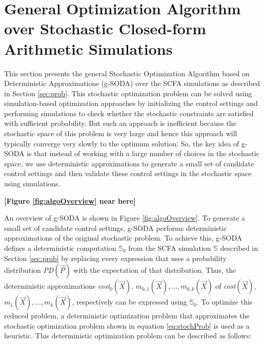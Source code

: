 \documentclass[a4paper, 12pt]{article} %
\begin{document}
\section{General Optimization Algorithm over Stochastic Closed-form Arithmetic Simulations}
\label{sec:algo}

This section presents the general Stochastic Optimization Algorithm based on Deterministic Approximations (g-SODA) over the SCFA simulations as described in Section \ref{sec:prob}. 
This stochastic optimization problem can be solved using simulation-based optimization approaches by initializing the control settings and performing simulations to check whether the stochastic constraints are satisfied with sufficient probability.
But such an approach is inefficient because the stochastic space of this problem is very large and hence this approach will typically converge very slowly to the optimum solution.
So, the key idea of g-SODA is that instead of working with a large number of choices in the stochastic space, we use deterministic approximations to generate a small set of candidate control settings and then validate these control settings in the stochastic space using simulations.

\textbf{[Figure \ref{fig:algoOverview} near here]}



\newcommand{\algoSODAm}{Algorithm 1}
\newcommand{\algoInflDefl}{Algorithm 2}
\newcommand{\algoPerfInfl}{Algorithm 3}
\newcommand{\algoInflate}{Algorithm 4}
\newcommand{\algoPerfDefl}{Algorithm 5}
\newcommand{\algoDeflate}{Algorithm 6}
\newcommand{\algoRefineCand}{Algorithm 7}
\newcommand{\algoExOCBA}{Algorithm 8}
\newcommand{\algoStochSim}{Algorithm 9}



An overview of g-SODA is shown in Figure \ref{fig:algoOverview}. 
To generate a small set of candidate control settings, g-SODA performs deterministic approximations of the original stochastic problem. 
To achieve this, g-SODA defines a deterministic computation $\mathbb{S}_0$ from the SCFA simulation $\mathbb{S}$ described in Section \ref{sec:prob} by replacing every expression that uses a probability distribution \textit{PD}$(\vec{P})$ with the expectation of that distribution. 
Thus, the deterministic approximations \textit{cost$_0$}$(\vec{X})$, $m_{0,1}(\vec{X}),\dots,m_{0,k}(\vec{X})$ of \textit{cost}$(\vec{X})$, $m_1(\vec{X}),\dots,m_k(\vec{X})$, respectively can be expressed using $\mathbb{S}_0$.
To optimize this reduced problem, a deterministic optimization problem that approximates the stochastic optimization problem shown in equation \ref{eq:stochProb} is used as a heuristic. This deterministic optimization problem can be described as follows:
\end{document}
